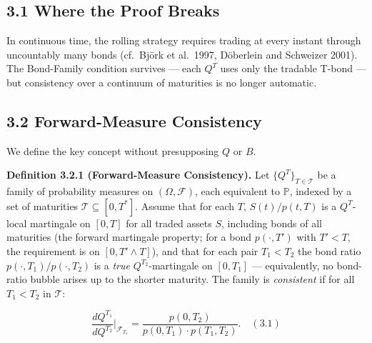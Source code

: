 \documentclass[
]{article}
\begin{document}
\subsection{3.1 Where the Proof Breaks}\label{where-the-proof-breaks}

In continuous time, the rolling strategy requires trading at every
instant through uncountably many bonds (cf.~Björk et al.~1997, Döberlein
and Schweizer 2001). The Bond-Family condition survives --- each \(Q^T\)
uses only the tradable T-bond --- but consistency over a continuum of
maturities is no longer automatic.

\subsection{3.2 Forward-Measure
Consistency}\label{forward-measure-consistency}

We define the key concept without presupposing \(Q\) or \(B\).

\textbf{Definition 3.2.1 (Forward-Measure Consistency).} Let
\(\{Q^T\}_{T \in \mathcal{T}}\) be a family of probability measures on
\((\Omega, \mathcal{F})\), each equivalent to \(\mathbb{P}\), indexed by
a set of maturities \(\mathcal{T} \subseteq [0, T^*]\). Assume that for
each \(T\), \(S(t)/p(t,T)\) is a \(Q^T\)-local martingale on \([0,T]\)
for all traded assets \(S\), including bonds of all maturities (the
forward martingale property; for a bond \(p(\cdot,T')\) with \(T' < T\),
the requirement is on \([0, T' \wedge T]\)), and that for each pair
\(T_1 < T_2\) the bond ratio \(p(\cdot,T_1)/p(\cdot,T_2)\) is a
\emph{true} \(Q^{T_2}\)-martingale on \([0,T_1]\) --- equivalently, no
bond-ratio bubble arises up to the shorter maturity. The family is
\emph{consistent} if for all \(T_1 < T_2\) in \(\mathcal{T}\):

\[\frac{dQ^{T_1}}{dQ^{T_2}}\bigg|_{\mathcal{F}_{T_1}} = \frac{p(0,T_2)}{p(0,T_1) \cdot p(T_1,T_2)}.   \quad (3.1)\]
\end{document}
